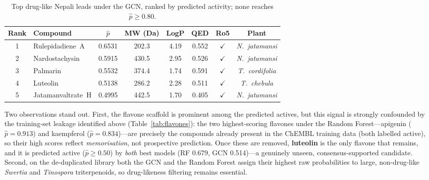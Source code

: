 \begin{table}[H]
\small
\centering
\caption{Top drug-like Nepali leads under the GCN, ranked by predicted activity; none reaches $\hat{p}\geq0.80$.}
\label{tab:leads_gcn}
{\singlespacing
\begin{tabular}{clcccccc}
\toprule
\textbf{Rank} & \textbf{Compound} & \textbf{$\hat{p}$}
              & \textbf{MW (Da)} & \textbf{LogP} & \textbf{QED}
              & \textbf{Ro5} & \textbf{Plant} \\
\midrule
1 & Rulepidadiene~A   & 0.6531 & 202.3 & 4.19 & 0.552 & $\checkmark$ & \textit{N.~jatamansi}  \\
2 & Nardostachysin    & 0.5915 & 430.5 & 2.95 & 0.526 & $\checkmark$ & \textit{N.~jatamansi}  \\
3 & Palmarin          & 0.5532 & 374.4 & 1.74 & 0.591 & $\checkmark$ & \textit{T.~cordifolia} \\
4 & Luteolin          & 0.5138 & 286.2 & 2.28 & 0.511 & $\checkmark$ & \textit{T.~chebula}    \\
5 & Jatamanvaltrate~H & 0.4995 & 442.5 & 1.70 & 0.405 & $\checkmark$ & \textit{N.~jatamansi}  \\
\bottomrule
\end{tabular}
}
\end{table}

Two observations stand out. First, the flavone scaffold is prominent among the
predicted actives, but this signal is strongly confounded by the training-set leakage
identified above (Table~\ref{tab:flavones}): the two highest-scoring flavones under the
Random Forest---apigenin ($\hat{p} = 0.913$) and kaempferol ($\hat{p} = 0.834$)---are
precisely the compounds already present in the ChEMBL training data (both labelled
active), so their high scores reflect \emph{memorisation}, not prospective prediction.
Once these are removed, \textbf{luteolin} is the only flavone that remains, and it is
predicted active ($\hat{p} \geq 0.50$) by \emph{both} best models (RF 0.679, GCN
0.514)---a genuinely unseen, consensus-supported candidate. Second, on the
de-duplicated library both the GCN and the Random Forest assign their highest raw
probabilities to large, non-drug-like \textit{Swertia} and \textit{Tinospora}
triterpenoids, so drug-likeness filtering remains essential.

